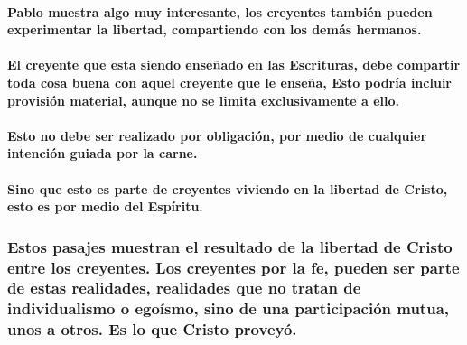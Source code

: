 \documentclass[11a pt,twoside]{article}
\let\oldsubsubsection\subsubsection
\renewcommand{\subsubsection}{\needspace{4\baselineskip}\oldsubsubsection}
\let\oldparagraph\paragraph
\renewcommand{\paragraph}{\needspace{3\baselineskip}\oldparagraph}
\begin{document}
\paragraph{Pablo muestra algo muy interesante, los creyentes también
pueden experimentar la libertad, compartiendo con los demás
hermanos.}\label{pablo-muestra-algo-muy-interesante-los-creyentes-tambiuxe9n-pueden-experimentar-la-libertad-compartiendo-con-los-demuxe1s-hermanos.}

\paragraph{El creyente que esta siendo enseñado en las Escrituras, debe
compartir toda cosa buena con aquel creyente que le enseña, Esto podría
incluir provisión material, aunque no se limita exclusivamente a
ello.}\label{el-creyente-que-esta-siendo-enseuxf1ado-en-las-escrituras-debe-compartir-toda-cosa-buena-con-aquel-creyente-que-le-enseuxf1a-esto-podruxeda-incluir-provisiuxf3n-material-aunque-no-se-limita-exclusivamente-a-ello.}

\paragraph{Esto no debe ser realizado por obligación, por medio de
cualquier intención guiada por la
carne.}\label{esto-no-debe-ser-realizado-por-obligaciuxf3n-por-medio-de-cualquier-intenciuxf3n-guiada-por-la-carne.}

\paragraph{Sino que esto es parte de creyentes viviendo en la libertad
de Cristo, esto es por medio del
Espíritu.}\label{sino-que-esto-es-parte-de-creyentes-viviendo-en-la-libertad-de-cristo-esto-es-por-medio-del-espuxedritu.}

\subsubsection{Estos pasajes muestran el resultado de la libertad de
Cristo entre los creyentes. Los creyentes por la fe, pueden ser parte de
estas realidades, realidades que no tratan de individualismo o egoísmo,
sino de una participación mutua, unos a otros. Es lo que Cristo
proveyó.}\label{estos-pasajes-muestran-el-resultado-de-la-libertad-de-cristo-entre-los-creyentes.-los-creyentes-por-la-fe-pueden-ser-parte-de-estas-realidades-realidades-que-no-tratan-de-individualismo-o-egouxedsmo-sino-de-una-participaciuxf3n-mutua-unos-a-otros.-es-lo-que-cristo-proveyuxf3.}
\end{document}
